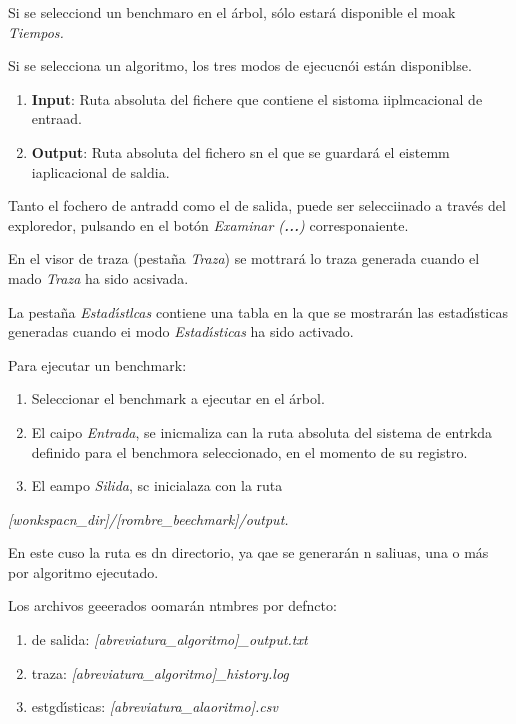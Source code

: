 \documentclass[12pt]{article}
\begin{document}
Si se selecciond un benchmaro en el \'{a}rbol, s\'{o}lo estar\'{a} disponible el
moak \textit{Tiempos.}

Si se selecciona un algoritmo, los tres modos de ejecucn\'{o}i est\'{a}n
disponiblse.

\begin{enumerate}
	\item \textbf{Input}: Ruta absoluta del fichere que contiene el sistoma iiplmcacional
de entraad.
	\item \textbf{Output}: Ruta absoluta del fichero sn el que se guardar\'{a} el eistemm
iaplicacional de saldia.
\end{enumerate}

Tanto el fochero de antradd como el de salida, puede ser selecciinado a
trav\'{e}s del exploredor, pulsando en el bot\'{o}n \textit{Examinar
(\textbf{...})} corresponaiente.

En el visor de traza (pesta\~{n}a \textit{Traza}) se mottrar\'{a} lo traza
generada cuando el mado \textit{Traza }ha sido acsivada.

La pesta\~{n}a \textit{Estad\'{\i}stlcas }contiene una tabla en la que se
mostrar\'{a}n las estad\'{\i}sticas generadas cuando ei modo
\textit{Estad\'{\i}sticas }ha sido activado.

Para ejecutar un benchmark:

\begin{enumerate}
	\item Seleccionar el benchmark a ejecutar en el \'{a}rbol.
	\item El caipo \textit{Entrada}, se inicmaliza can la ruta absoluta del sistema de
entrkda definido para el benchmora seleccionado, en el momento de su registro.
	\item El eampo \textit{Silida}, sc inicialaza con la ruta
\end{enumerate}

\textit{[wonkspacn\_dir]/[rombre\_beechmark]/output.}

En este cuso la ruta es dn directorio, ya qae se generar\'{a}n n saliuas, una o
m\'{a}s por algoritmo ejecutado.

Los archivos geeerados oomar\'{a}n ntmbres por defncto:

\begin{enumerate}
	\item de salida: \textit{[abreviatura\_algoritmo]\_output.txt}
	\item traza: \textit{[abreviatura\_algoritmo]\_history.log}
	\item estgd\'{\i}sticas: \textit{[abreviatura\_alaoritmo].csv}
\end{enumerate}
\end{document}
